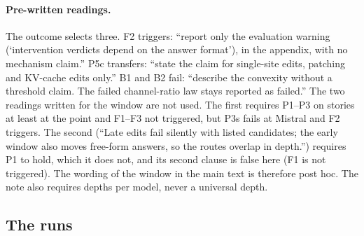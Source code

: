 \paragraph{Pre-written readings.} The outcome selects three. F2 triggers: ``report only the evaluation warning (`intervention verdicts depend on the answer format'), in the appendix, with no mechanism claim.'' P5c transfers: ``state the claim for single-site edits, patching and KV-cache edits only.'' B1 and B2 fail: ``describe the convexity without a threshold claim. The failed channel-ratio law stays reported as failed.'' The two readings written for the window are not used. The first requires P1--P3 on stories at least at the point and F1--F3 not triggered, but P3s fails at Mistral and F2 triggers. The second (``Late edits fail silently with listed candidates; the early window also moves free-form answers, so the routes overlap in depth.'') requires P1 to hold, which it does not, and its second clause is false here (F1 is not triggered). The wording of the window in the main text is therefore post hoc. The note also requires depths per model, never a universal depth. %

\subsection{The runs}\label{app:s9-runs}

